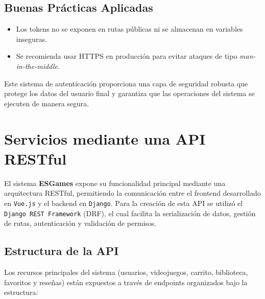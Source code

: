 \documentclass{article}
\begin{document}
\subsection{Buenas Prácticas Aplicadas}

\begin{itemize}
    \item Los tokens no se exponen en rutas públicas ni se almacenan en variables inseguras.
    \item Se recomienda usar HTTPS en producción para evitar ataques de tipo \textit{man-in-the-middle}.
\end{itemize}

Este sistema de autenticación proporciona una capa de seguridad robusta que protege los datos del usuario final y garantiza que las operaciones del sistema se ejecuten de manera segura.

\section{Servicios mediante una API RESTful}

El sistema \textbf{ESGames} expone su funcionalidad principal mediante una arquitectura RESTful, permitiendo la comunicación entre el frontend desarrollado en \texttt{Vue.js} y el backend en \texttt{Django}. Para la creación de esta API se utilizó el \texttt{Django REST Framework} (DRF), el cual facilita la serialización de datos, gestión de rutas, autenticación y validación de permisos.

\subsection{Estructura de la API}

Los recursos principales del sistema (usuarios, videojuegos, carrito, biblioteca, favoritos y reseñas) están expuestos a través de endpoints organizados bajo la estructura:
\end{document}
